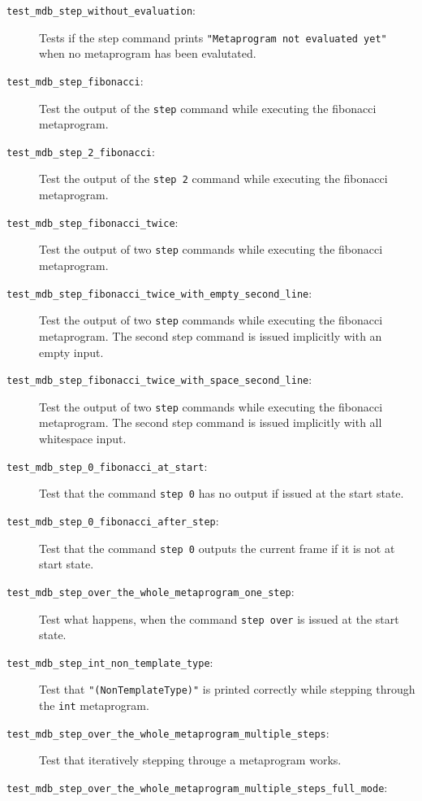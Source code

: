 \begin{description}
    \item[\texttt{test\_mdb\_step\_without\_evaluation}:]
        Tests if the step command prints
        \texttt{"Metaprogram not evaluated yet"} when no metaprogram has been
        evalutated.
    \item[\texttt{test\_mdb\_step\_fibonacci}:]
        Test the output of the \texttt{step} command while executing the
        fibonacci metaprogram.
    \item[\texttt{test\_mdb\_step\_2\_fibonacci}:]
        Test the output of the \texttt{step 2} command while executing the
        fibonacci metaprogram.
    \item[\texttt{test\_mdb\_step\_fibonacci\_twice}:]
        Test the output of two \texttt{step} commands while executing the
        fibonacci metaprogram.
    \item[\texttt{test\_mdb\_step\_fibonacci\_twice\_with\_empty\_second\_line}:]
        Test the output of two \texttt{step} commands while executing the
        fibonacci metaprogram. The second step command is issued implicitly
        with an empty input.
    \item[\texttt{test\_mdb\_step\_fibonacci\_twice\_with\_space\_second\_line}:]
        Test the output of two \texttt{step} commands while executing the
        fibonacci metaprogram. The second step command is issued implicitly
        with all whitespace input.
    \item[\texttt{test\_mdb\_step\_0\_fibonacci\_at\_start}:]
        Test that the command \texttt{step 0} has no output if issued at the
        start state.
    \item[\texttt{test\_mdb\_step\_0\_fibonacci\_after\_step}:]
        Test that the command \texttt{step 0} outputs the current frame if it
        is not at start state.
    \item[\texttt{test\_mdb\_step\_over\_the\_whole\_metaprogram\_one\_step}:]
        Test what happens, when the command \texttt{step over} is issued at the
        start state.
    \item[\texttt{test\_mdb\_step\_int\_non\_template\_type}:]
        Test that \texttt{"(NonTemplateType)"} is printed correctly while
        stepping through the \texttt{int} metaprogram.
    \item[\texttt{test\_mdb\_step\_over\_the\_whole\_metaprogram\_multiple\_steps}:]
        Test that iteratively stepping througe a metaprogram works.
    \item[\texttt{test\_mdb\_step\_over\_the\_whole\_metaprogram\_multiple\_steps\_full\_mode}:]

\end{description}
